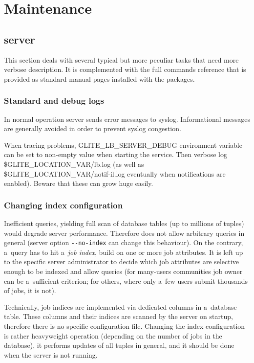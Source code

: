 \section{Maintenance}

\subsection{\LB server}

This section deals with several typical but more peculiar tasks
that need more verbose description.
It is complemented with the full commands reference that is provided
as standard manual pages installed with the \LB packages.

\subsubsection{Standard and debug logs}

In normal operation \LB server sends error messages to syslog.
Informational messages are generally avoided in order to prevent syslog congestion.

\begin{sloppypar}
When tracing problems, GLITE\_LB\_SERVER\_DEBUG environment variable can be set to
non-empty value when starting the service.
Then verbose log \$GLITE\_LOCATION\_VAR/lb.log 
(as well as \$GLITE\_LOCATION\_VAR/notif-il.log eventually when notifications are enabled).
Beware that these can grow huge easily.
\end{sloppypar}

\subsubsection{Changing index configuration}

Inefficient queries, yielding full scan of \LB database tables (up to millions of tuples) would degrade server performance.
Therefore \LB does not allow arbitrary queries in general
(server option \verb'--no-index' can change this behaviour).
On the contrary, a~query has to hit a~\emph{job index}, build on one or
more job attributes.
It is left up to the specific \LB server administrator to decide
which job attributes are selective enough to be indexed and allow queries
(\eg for many-users communities job owner can be a~sufficient criterion;
for others, where only a~few users submit thousands of jobs, it is not).

Technically, job indices are implemented via dedicated columns
in a~database table.
These columns and their indices are scanned by the \LB server on startup,
therefore there is no specific configuration file.
Changing the index configuration is rather heavyweight operation
(depending on the number of jobs in the database), it performs
updates of all tuples in general, and it should be done when the server is not
running.

